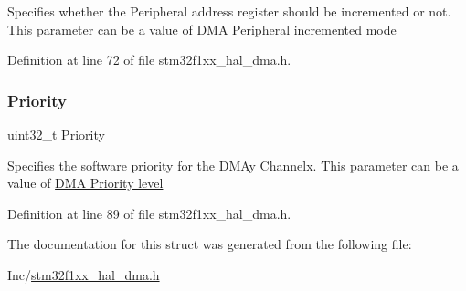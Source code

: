Specifies whether the Peripheral address register should be incremented or not. This parameter can be a value of \hyperlink{group___d_m_a___peripheral__incremented__mode}{D\+MA Peripheral incremented mode} 

Definition at line 72 of file stm32f1xx\+\_\+hal\+\_\+dma.\+h.

\mbox{\label{struct_d_m_a___init_type_def_a72acf77c0b19359eb70764505ae4bd70}} 
\subsubsection{\texorpdfstring{Priority}{Priority}}
{\footnotesize\ttfamily uint32\+\_\+t Priority}

Specifies the software priority for the D\+M\+Ay Channelx. This parameter can be a value of \hyperlink{group___d_m_a___priority__level}{D\+MA Priority level} 

Definition at line 89 of file stm32f1xx\+\_\+hal\+\_\+dma.\+h.



The documentation for this struct was generated from the following file\+:\begin{DoxyCompactItemize}
\item 
Inc/\hyperlink{stm32f1xx__hal__dma_8h}{stm32f1xx\+\_\+hal\+\_\+dma.\+h}\end{DoxyCompactItemize}
